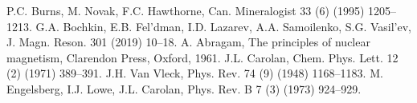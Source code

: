 \begin{thebibliography}{}
 P.C. Burns, M. Novak, F.C. Hawthorne, Can. Mineralogist 33 (6) (1995) 1205– 1213.
 G.A. Bochkin, E.B. Fel’dman, I.D. Lazarev, A.A. Samoilenko, S.G. Vasil’ev, J. Magn. Reson. 301 (2019) 10–18.
 A. Abragam, The principles of nuclear magnetism, Clarendon Press, Oxford, 1961.
 J.L. Carolan, Chem. Phys. Lett. 12 (2) (1971) 389–391.
 J.H. Van Vleck, Phys. Rev. 74 (9) (1948) 1168–1183.
 M. Engelsberg, I.J. Lowe, J.L. Carolan, Phys. Rev. B 7 (3) (1973) 924–929.


\end{thebibliography}
